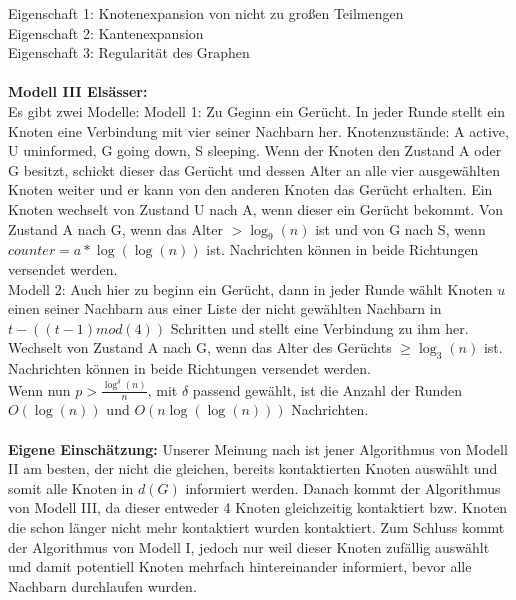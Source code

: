 \documentclass[12pt,a4paper]{report}
\begin{document}
Eigenschaft 1: Knotenexpansion von nicht zu großen Teilmengen\\
Eigenschaft 2: Kantenexpansion\\
Eigenschaft 3: Regularität des Graphen
\\
\\
\textbf{Modell III Elsässer:}\\
Es gibt zwei Modelle: Modell 1: Zu Geginn ein Gerücht. In jeder Runde stellt ein Knoten eine Verbindung mit vier seiner Nachbarn her. Knotenzustände: A active, U uninformed, G going down, S sleeping. Wenn der Knoten den Zustand A oder G besitzt, schickt dieser das Gerücht und dessen Alter an alle vier ausgewählten Knoten weiter und er kann von den anderen Knoten das Gerücht erhalten. Ein Knoten wechselt von Zustand U nach A, wenn dieser ein Gerücht bekommt.
Von Zustand A nach G, wenn das Alter $>\log_9(n)$ ist und von G nach S, wenn $counter = a*\log(\log(n))$ ist. Nachrichten können in beide Richtungen versendet werden.\\
Modell 2: Auch hier zu beginn ein Gerücht, dann in jeder Runde wählt Knoten $u$ einen seiner Nachbarn aus einer Liste der nicht gewählten Nachbarn in $t-((t-1)mod(4))$ Schritten und stellt eine Verbindung zu ihm her. Wechselt von Zustand A nach G, wenn das Alter des Gerüchts $\ge \log_3(n)$ ist. Nachrichten können in beide Richtungen versendet werden.\\
Wenn nun $p>\frac{\log^{\delta}(n)}{n}$, mit $\delta$ passend gewählt, ist die Anzahl der Runden $O(\log(n))$ und $O(n\log(\log(n)))$ Nachrichten.
\\
\\
\textbf{Eigene Einschätzung:} Unserer Meinung nach ist jener Algorithmus von Modell II am besten, der nicht die gleichen, bereits kontaktierten Knoten auswählt und somit alle Knoten in $d(G)$ informiert werden. Danach kommt der Algorithmus von Modell III, da dieser entweder 4 Knoten gleichzeitig kontaktiert bzw. Knoten die schon länger nicht mehr kontaktiert wurden kontaktiert. Zum Schluss kommt der Algorithmus von Modell I, jedoch nur weil dieser Knoten zufällig auswählt und damit potentiell Knoten mehrfach hintereinander informiert, bevor alle Nachbarn durchlaufen wurden.
\end{document}
